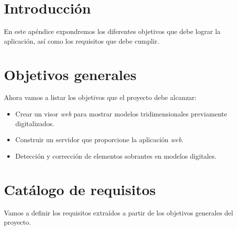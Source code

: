 
\section{Introducción}
En este apéndice expondremos los diferentes objetivos que debe lograr la aplicación, así como los requisitos que debe cumplir.

\section{Objetivos generales}
Ahora vamos a listar los objetivos que el proyecto debe alcanzar:
\begin{itemize}
	\item Crear un visor \textit{web} para mostrar modelos tridimensionales previamente digitalizados.
	\item Construir un servidor que proporcione la aplicación \textit{web}.
	\item Detección y corrección de elementos sobrantes en modelos digitales.
\end{itemize}

\section{Catálogo de requisitos}
Vamos a definir los requisitos extraídos a partir de los objetivos generales del proyecto.

